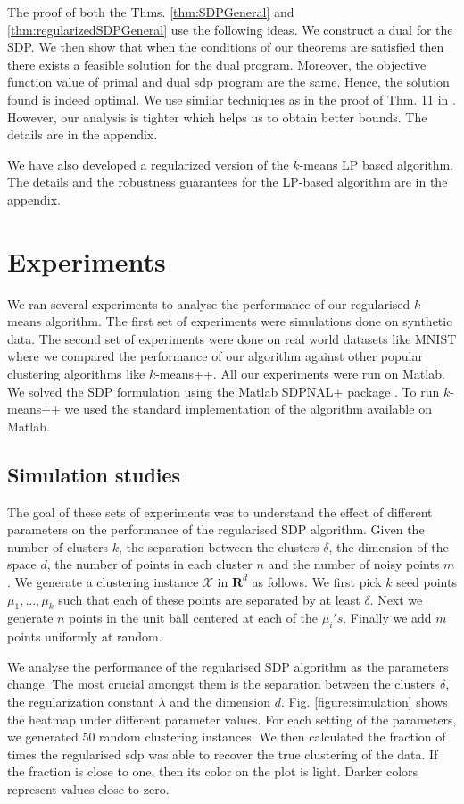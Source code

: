 \documentclass[12pt]{article}
\newcommand{\mc}{\mathcal}
\newcommand{\mb}{\mathbf}
\begin{document}
The proof of both the Thms. \ref{thm:SDPGeneral} and \ref{thm:regularizedSDPGeneral} use the following ideas. We construct a dual for the SDP. We then show that when the conditions of our theorems are satisfied then there exists a feasible solution for the dual program. Moreover, the objective function value of primal and dual sdp program are the same. Hence, the solution found is indeed optimal. We use similar techniques as in the proof of Thm. 11 in \cite{awasthi2015relax}. However, our analysis is tighter which helps us to obtain better bounds. The details are in the appendix.

We have also developed a regularized version of the $k$-means LP based algorithm. The details and the robustness guarantees for the LP-based algorithm are in the appendix. 

\section{Experiments}
We ran several experiments to analyse the performance of our regularised $k$-means algorithm. The first set of experiments were simulations done on synthetic data. The second set of experiments were done on real world datasets like MNIST where we compared the performance of our algorithm against other popular clustering algorithms like $k$-means++. All our experiments were run on Matlab. We solved the SDP formulation using the Matlab SDPNAL+ package \cite{yang2015sdpnal+}. To run $k$-means++ we used the standard implementation of the algorithm available on Matlab.

\subsection{Simulation studies}
The goal of these sets of experiments was to understand the effect of different parameters on the performance of the regularised SDP algorithm. Given the number of clusters $k$, the separation between the clusters $\delta$, the dimension of the space $d$, the number of points in each cluster $n$ and the number of noisy points $m$. We generate a clustering instance $\mc X$ in $\mb R^d$ as follows. We first pick $k$ seed points $\mu_1, \ldots, \mu_k$ such that each of these points are separated by at least $\delta$. Next we generate $n$ points in the unit ball centered at each of the $\mu_i's$. Finally we add $m$ points uniformly at random. 

We analyse the performance of the regularised SDP algorithm as the parameters change. The most crucial amongst them is the separation between the clusters $\delta$, the regularization constant $\lambda$ and the dimension $d$. Fig. \ref{figure:simulation} shows the heatmap under different parameter values. For each setting of the parameters, we generated 50 random clustering instances. We then calculated the fraction of times the regularised sdp was able to recover the true clustering of the data. If the fraction is close to one, then its color on the plot is light. Darker colors represent values close to zero.
\end{document}
